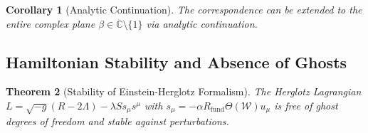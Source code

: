 \documentclass[11pt, a4paper]{article}
\theoremstyle{plain}
\newtheorem{theorem}{Theorem}[section]
\newtheorem{corollary}[theorem]{Corollary}
\theoremstyle{definition}
\newcommand{\Rfactor}{R_{\text{fund}}}
\begin{document}
\begin{corollary}[Analytic Continuation]
The correspondence can be extended to the entire complex plane $\beta \in \mathbb{C} \setminus \{1\}$ via analytic continuation.
\end{corollary}

\subsection{Hamiltonian Stability and Absence of Ghosts}
\label{app:stability}

\begin{theorem}[Stability of Einstein-Herglotz Formalism]
The Herglotz Lagrangian $L = \sqrt{-g}(R - 2\Lambda) - \lambda S s_\mu s^\mu$ with $s_\mu = -\alpha \Rfactor \Theta(\mathcal{W}) u_\mu$ is free of ghost degrees of freedom and stable against perturbations.
\end{theorem}
\end{document}
